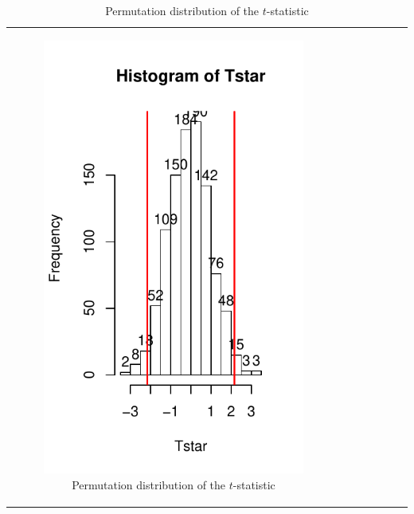 \documentclass[]{book}
\theoremstyle{definition}
\theoremstyle{definition}
\theoremstyle{remark}
\begin{document}
\begin{longtable}[]{@{}ccccccc@{}}
\begin{minipage}[b]{0.10\columnwidth}
\begin{figure}
\centering
\includegraphics{02-reintroductionToStatistics_files/figure-latex/Figure2-12-1.pdf}
\caption{\label{fig:Figure2-12}Permutation distribution of the \(t\)-statistic}
\end{figure}


\end{minipage}
\end{longtable}
\end{document}
